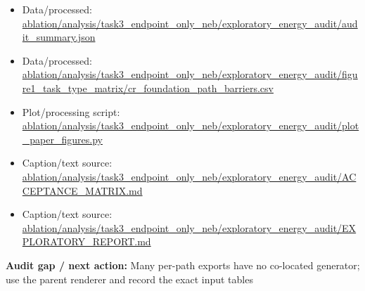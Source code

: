 \documentclass[10pt]{article}
\newcommand{\statusline}[1]{\colorbox{gray!12}{\parbox{0.96\linewidth}{#1}}}
\begin{document}
\begin{itemize}[leftmargin=1.4em,noitemsep]
\item Data/processed: \begingroup\scriptsize\url{ablation/analysis/task3_endpoint_only_neb/exploratory_energy_audit/audit_summary.json}\endgroup
\item Data/processed: \begingroup\scriptsize\url{ablation/analysis/task3_endpoint_only_neb/exploratory_energy_audit/figure1_task_type_matrix/cr_foundation_path_barriers.csv}\endgroup
\item Plot/processing script: \begingroup\scriptsize\url{ablation/analysis/task3_endpoint_only_neb/exploratory_energy_audit/plot_paper_figures.py}\endgroup
\item Caption/text source: \begingroup\scriptsize\url{ablation/analysis/task3_endpoint_only_neb/exploratory_energy_audit/ACCEPTANCE_MATRIX.md}\endgroup
\item Caption/text source: \begingroup\scriptsize\url{ablation/analysis/task3_endpoint_only_neb/exploratory_energy_audit/EXPLORATORY_REPORT.md}\endgroup
\end{itemize}
\statusline{\textbf{Audit gap / next action:} Many per-path exports have no co-located generator; use the parent renderer and record the exact input tables}
\vfill
\clearpage
\end{document}
